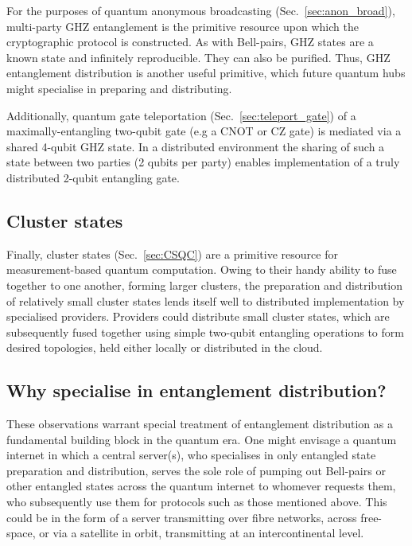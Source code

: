 For the purposes of quantum anonymous broadcasting (Sec.~\ref{sec:anon_broad}), multi-party GHZ entanglement is the primitive resource upon which the cryptographic protocol is constructed. As with Bell-pairs, GHZ states are a known state and infinitely reproducible. They can also be purified. Thus, GHZ entanglement distribution is another useful primitive, which future quantum hubs might specialise in preparing and distributing.

Additionally, quantum gate teleportation (Sec.~\ref{sec:teleport_gate}) of a maximally-entangling two-qubit gate (e.g a CNOT or CZ gate) is mediated via a shared 4-qubit GHZ state. In a distributed environment the sharing of such a state between two parties (2 qubits per party) enables implementation of a truly distributed 2-qubit entangling gate.


%
%

\subsection{Cluster states}

Finally, cluster states (Sec.~\ref{sec:CSQC}) are a primitive resource for measurement-based quantum computation. Owing to their handy ability to fuse together to one another, forming larger clusters, the preparation and distribution of relatively small cluster states lends itself well to distributed implementation by specialised providers. Providers could distribute small cluster states, which are subsequently fused together using simple two-qubit entangling operations to form desired topologies, held either locally or distributed in the cloud.

%
%

\subsection{Why specialise in entanglement distribution?}

These observations warrant special treatment of entanglement distribution as a fundamental building block in the quantum era. One might envisage a quantum internet in which a central server(s), who specialises in only entangled state preparation and distribution, serves the sole role of pumping out Bell-pairs or other entangled states across the quantum internet to whomever requests them, who subsequently use them for protocols such as those mentioned above. This could be in the form of a server transmitting over fibre networks, across free-space, or via a satellite in orbit, transmitting at an intercontinental level.

